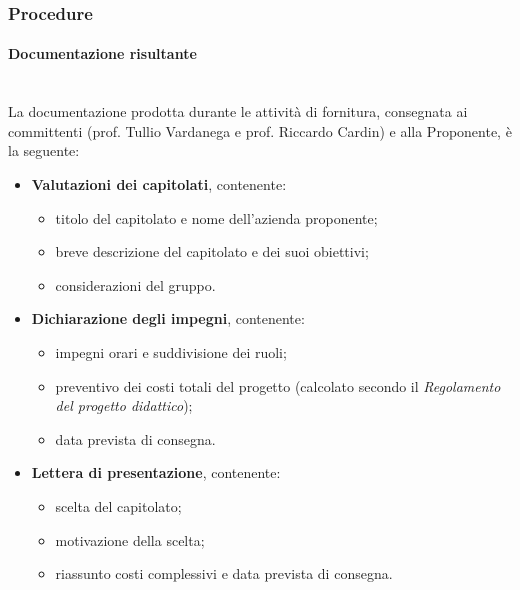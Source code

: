 \documentclass[10pt, letterpaper]{article}
\newcommand{\trisubsection}[1]{\paragraph{#1}\mbox{}\\}
\begin{document}
\subsubsection{Procedure}
\trisubsection{Documentazione risultante}
La documentazione prodotta durante le attività di fornitura, consegnata ai committenti (prof. Tullio Vardanega e prof. Riccardo Cardin) e alla Proponente, è la seguente:
\begin{itemize}
    \item \textbf{Valutazioni dei capitolati}, contenente:
          \begin{itemize}
              \item titolo del capitolato e nome dell'azienda proponente;
              \item breve descrizione del capitolato e dei suoi obiettivi;
              \item considerazioni del gruppo.
          \end{itemize}
    \item \textbf{Dichiarazione degli impegni}, contenente:
          \begin{itemize}
              \item impegni orari e suddivisione dei ruoli;
              \item preventivo dei costi totali del progetto (calcolato secondo il \textit{Regolamento del progetto didattico});
              \item data prevista di consegna.
          \end{itemize}
    \item \textbf{Lettera di presentazione}, contenente:
          \begin{itemize}
              \item scelta del capitolato;
              \item motivazione della scelta;
              \item riassunto costi complessivi e data prevista di consegna.
          \end{itemize}
\end{itemize}
\end{document}

